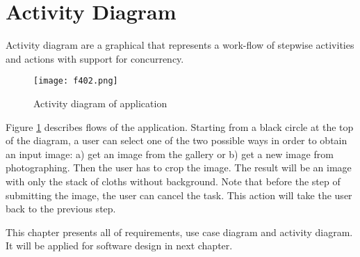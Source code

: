 \section{Activity Diagram}
Activity diagram are a graphical that represents a work-flow of stepwise activities and actions with support for concurrency.
\begin{figure}[t]
	\centering
	\texttt{[image: f402.png]}
	\caption{Activity diagram of application}
	\label{fig:f402}
\end{figure}

Figure \ref{fig:f402} describes flows of the application. Starting from a black circle at the top of the diagram, a user can select one of the two possible ways in order to obtain an input image: a) get an image from the gallery or b) get a new image from photographing. Then the user has to crop the image. The result will be an image with only the stack of cloths without background. Note that before the step of submitting the image, the user can cancel the task. This action will take the user back to the previous step.

This chapter presents all of requirements, use case diagram and activity diagram. It will be applied for software design in next chapter.
